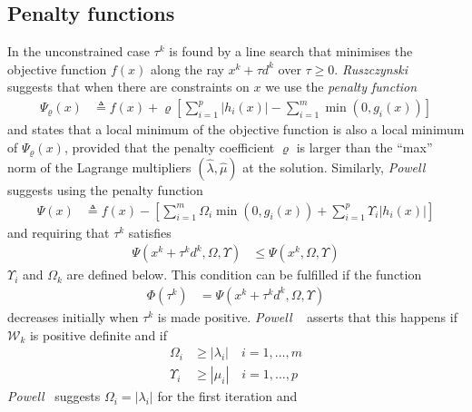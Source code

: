 \documentclass[a4paper,twoside,10pt,english]{report}
\begin{document}
\subsection{Penalty functions}
In the unconstrained case $\tau^{k}$ is found by a line search that
minimises the objective function $f\left(x\right)$ along the ray
$x^{k}+\tau d^{k}$ over $\tau\ge0$. \emph{Ruszczynski} 
~\cite[p.329]{Ruszczynski_NonlinearOptimization}
suggests that when there are constraints on $x$ we use the \emph{penalty
function} 
\begin{align*}
\Psi_{\varrho}\left(x\right) & \triangleq f\left(x\right)+\varrho\left[\sum_{i=1}^{p}\left|h_{i}\left(x\right)\right|-\sum_{i=1}^{m}\min\left(0,g_{i}\left(x\right)\right)\right]
\end{align*}
and states that a local minimum of the objective function is also
a local minimum of $\Psi_{\varrho}\left(x\right)$, provided that
the penalty coefficient $\varrho$ is larger than the ``max'' norm
of the Lagrange multipliers $\left(\hat{\lambda},\hat{\mu}\right)$
at the solution. Similarly, \emph{Powell}
~\cite[p.151]{Powell_FastNonlinearConstrainedOptimization}
suggests using the penalty function 
\begin{align*}
\Psi\left(x\right) & \triangleq f\left(x\right)-\left[\sum_{i=1}^{m}\Omega_{i}\min\left(0,g_{i}\left(x\right)\right)+\sum_{i=1}^{p}\Upsilon_{i}\left|h_{i}\left(x\right)\right|\right]
\end{align*}
and requiring that $\tau^{k}$ satisfies 
\begin{align*}
\Psi\left(x^{k}+\tau^{k}d^{k},\Omega,\Upsilon\right) & \le \Psi\left(x^{k},\Omega,\Upsilon\right)
\end{align*}
$\Upsilon_{i}$ and $\Omega_{k}$ are defined below. This condition
can be fulfilled if the function 
\begin{align*}
\Phi\left(\tau^{k}\right) &= \Psi\left(x^{k}+\tau^{k}d^{k},\Omega,\Upsilon\right)
\end{align*}
decreases initially when $\tau^{k}$ is made positive. \emph{Powell} 
~\cite{Powell_FastNonlinearConstrainedOptimization}
asserts that this happens if $\mathcal{W}_{k}$ is positive definite and if
\begin{align*}
\Omega_{i} & \ge \left|\lambda_{i}\right|\quad i=1,\ldots,m\\
\Upsilon_{i} & \ge \left|\mu_{i}\right|\quad i=1,\ldots,p
\end{align*}
\emph{Powell}~\cite[p.151]{Powell_FastNonlinearConstrainedOptimization} suggests
$\Omega_{i}=\left|\lambda_{i}\right|$ for the first iteration and
\end{document}
